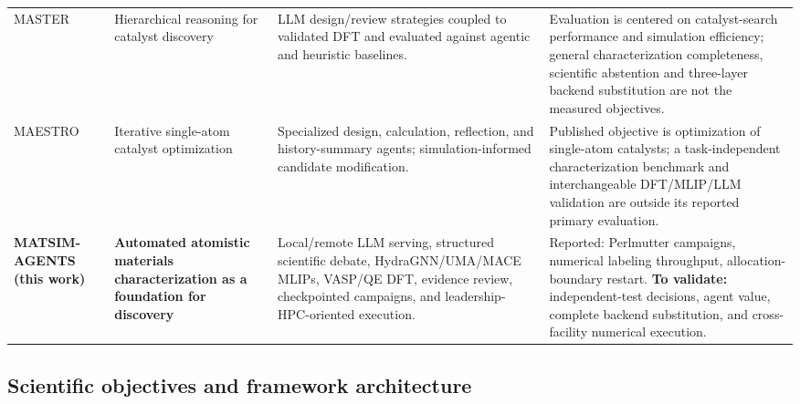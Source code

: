 \documentclass[11pt,a4paper]{article}
\begin{document}
\begin{table}[htbp]
\begin{tabularx}{\textwidth}{@{}>{\RaggedRight\arraybackslash}p{}>{\RaggedRight\arraybackslash}p{}>{\RaggedRight\arraybackslash}X >{\RaggedRight\arraybackslash}p{}@{}}
\addlinespace
MASTER~\cite{master2026} & Hierarchical reasoning for catalyst discovery & LLM design/review strategies coupled to validated DFT and evaluated against agentic and heuristic baselines. & Evaluation is centered on catalyst-search performance and simulation efficiency; general characterization completeness, scientific abstention and three-layer backend substitution are not the measured objectives. \\
\addlinespace
MAESTRO~\cite{maestro2026} & Iterative single-atom catalyst optimization & Specialized design, calculation, reflection, and history-summary agents; simulation-informed candidate modification. & Published objective is optimization of single-atom catalysts; a task-independent characterization benchmark and interchangeable DFT/MLIP/LLM validation are outside its reported primary evaluation. \\
\addlinespace
\textbf{MATSIM-AGENTS (this work)} & \textbf{Automated atomistic materials characterization as a foundation for discovery} & Local/remote LLM serving, structured scientific debate, HydraGNN/UMA/MACE MLIPs, VASP/QE DFT, evidence review, checkpointed campaigns, and leadership-HPC-oriented execution. & Reported: Perlmutter campaigns, numerical labeling throughput, allocation-boundary restart. \textbf{To validate:} independent-test decisions, agent value, complete backend substitution, and cross-facility numerical execution. \\
\bottomrule
\end{tabularx}
\end{table}

\subsection{Scientific objectives and framework architecture}
\end{document}
